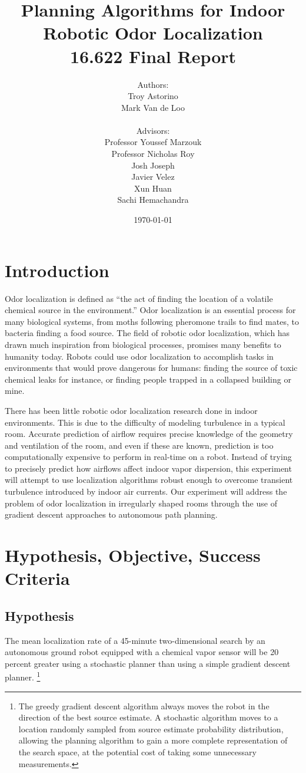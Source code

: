 \documentclass[submit, 12pt]{aiaa-pretty-modified}
\title{\textbf{Planning Algorithms for Indoor Robotic Odor
    Localization}\\
{16.622 Final Report}}
\date{\today}
\author{Authors: \\Troy Astorino \\ Mark Van de Loo \\
  \\ 
  Advisors:\\ Professor Youssef Marzouk \\ Professor Nicholas
    Roy \\ Josh Joseph \\ Javier Velez \\ Xun Huan \\ Sachi Hemachandra}
\begin{document}
\maketitle

\newpage

\tableofcontents

\newpage

\listoffigures

\newpage

\listoftables

\newpage
\onehalfspace

\section{Introduction}

Odor localization is defined as ``the act of finding the location of a
volatile chemical source in the environment.''\cite{kowadlo} Odor
localization is an essential process for many biological systems, from
moths following pheromone trails to find mates, to bacteria finding a
food source. The field of robotic odor localization, which has drawn
much inspiration from biological processes, promises many benefits to
humanity today. Robots could use odor localization to accomplish tasks
in environments that would prove dangerous for humans: finding the
source of toxic chemical leaks for instance, or finding people
trapped in a collapsed building or mine.

There has been little robotic odor localization research done in indoor
environments. This is due to the difficulty of modeling turbulence in a typical
room. Accurate prediction of airflow requires precise knowledge of the geometry
and ventilation of the room, and even if these are known, prediction is too
computationally expensive to perform in real-time on a robot. Instead of trying
to precisely predict how airflows affect indoor vapor dispersion, this
experiment will attempt to use localization algorithms robust enough to overcome
transient turbulence introduced by indoor air currents. Our experiment will
address the problem of odor localization in irregularly shaped rooms through the
use of gradient descent approaches to autonomous path planning.

\section{Hypothesis, Objective, Success Criteria}
\label{sec:hos}
\subsection*{Hypothesis} 
The mean localization rate of a 45-minute two-dimensional search by an
autonomous ground robot equipped with a chemical vapor sensor will be 20 percent
greater using a stochastic planner than using a simple gradient descent planner.
\footnote{ The greedy gradient descent algorithm always moves the robot in the
  direction of the best source estimate. A stochastic algorithm moves to a
  location randomly sampled from source estimate probability distribution,
  allowing the planning algorithm to gain a more complete representation of the
  search space, at the potential cost of taking some unnecessary measurements.}
\end{document}
